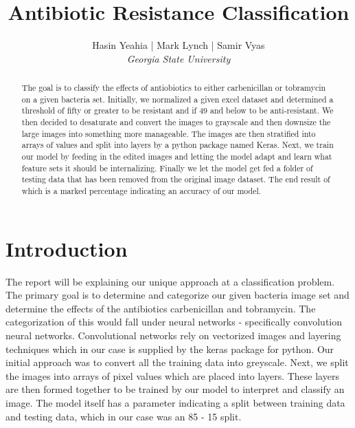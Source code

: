 \documentclass[conference]{IEEEtran}
\begin{document}
\title{Antibiotic Resistance Classification}
\author{
\IEEEauthorblockN
{Hasin Yeahia | Mark Lynch | Samir Vyas \\
\textit{Georgia State University}}

}
\maketitle

\begin{abstract}
\begin{center}
The goal is to classify the effects of antiobiotics to either carbenicillan or
tobramycin on a given bacteria set. Initially, we normalized a given excel dataset and determined a threshold of fifty or greater to be resistant and if 49 and below to be anti-resistant. We then decided to desaturate and convert the images to grayscale and then downsize the large images into something more
manageable. The images are then stratified into arrays of values and split into layers by a python package named Keras. Next, we train our model by feeding in the edited images and letting the model adapt and learn what feature sets it should be internalizing. Finally we let the model get fed a folder of testing data that has been removed from the original image dataset. The end result of which is a marked percentage indicating an accuracy of our model. 
\end{center}

\end{abstract}



\section{Introduction}
\label{secName}
The report will be explaining our unique approach at a classification problem. The primary goal is to determine and categorize our given bacteria image set and determine the effects of the antibiotics carbenicillan and tobramycin. The categorization of this would fall under neural networks - specifically convolution neural networks. Convolutional networks rely on vectorized images and layering techniques which in our case is supplied by the keras package for python. Our initial approach was to convert all the training data into greyscale. Next, we split the images into arrays of pixel values which are placed into layers. These layers are then formed together to be trained by our model to interpret and classify an image. The model itself has a parameter indicating a split between training data and testing data, which in our case was an 85 - 15 split.
\end{document}
